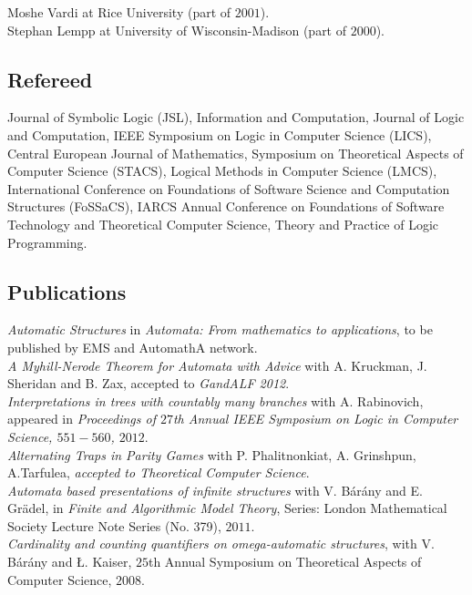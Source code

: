 \documentclass[a4paper]{article}
\begin{document}
Moshe Vardi at Rice University (part of $2001$).\\

Stephan Lempp at University of Wisconsin-Madison (part of $2000$).
\fi
\subsection*{Refereed}
{Journal of Symbolic Logic (JSL)}, {Information and Computation}, {Journal of Logic and Computation}, {IEEE Symposium on Logic in Computer Science (LICS)}, {Central European Journal of Mathematics}, {Symposium on Theoretical Aspects of Computer Science (STACS)}, {Logical Methods in Computer Science (LMCS)}, {International Conference on Foundations of Software Science and Computation Structures (FoSSaCS)}, {IARCS Annual Conference on
Foundations of Software Technology and Theoretical Computer Science}, {Theory and Practice of Logic Programming}.

\subsection*{Publications}
{\it Automatic Structures} in {\it Automata: From mathematics to applications}, to be published by EMS and AutomathA network.\\

{\it A Myhill-Nerode Theorem for Automata with Advice} with A. Kruckman, J. Sheridan and B. Zax, accepted to {\it GandALF 2012}.\\

{\it Interpretations in trees with countably many branches} with A. Rabinovich,  appeared in {\it Proceedings of 
$27$th Annual {IEEE} Symposium on Logic in Computer Science, $551-560$, $2012$}. \\

{\it Alternating Traps in Parity Games} with P. Phalitnonkiat, A. Grinshpun, A.Tarfulea, {\it accepted to {\em Theoretical Computer Science}}.\\

{\it Automata based presentations of infinite structures} with V. B{\'a}r{\'a}ny and E. Gr{\"a}del,
in {\it Finite and Algorithmic Model Theory},
Series: London Mathematical Society Lecture Note Series (No. 379), $2011$.\\

{\it Cardinality and counting quantifiers on omega-automatic structures}, with V.  B{\'a}r{\'a}ny and \L. Kaiser, 
$25$th Annual Symposium on Theoretical Aspects of Computer Science, $2008$.  \\
\end{document}
